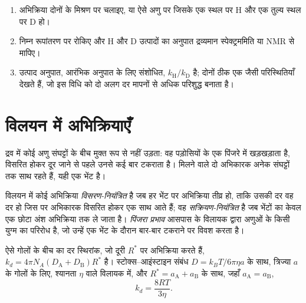 \begin{method}[प्रतिस्पर्धा द्वारा गतिक समस्थानिक प्रभाव का मापन]\label{met:b3:rate-theories:kie}
\begin{enumerate}
  \item अभिक्रिया दोनों  के मिश्रण पर चलाइए, या ऐसे
        अणु पर जिसके एक स्थल पर H और एक तुल्य स्थल पर D हो।
  \item निम्न रूपांतरण पर रोकिए और H और D उत्पादों का अनुपात
        द्रव्यमान स्पेक्ट्रममिति या NMR से मापिए।
  \item उत्पाद अनुपात, आरंभिक अनुपात के लिए संशोधित, $k_{\mathrm H}/k_{\mathrm D}$ है; दोनों
         ठीक एक जैसी परिस्थितियाँ देखते हैं, जो इस विधि को
        दो अलग दर मापनों से अधिक परिशुद्ध बनाता है।
\end{enumerate}
\end{method}

\section{विलयन में अभिक्रियाएँ}

द्रव में कोई अणु संघट्टों के बीच मुक्त रूप से नहीं उड़ता: वह
पड़ोसियों के एक पिंजरे में खड़खड़ाता है, विसरित होकर दूर जाने से पहले उनसे कई बार टकराता है।
मिलने वाले दो अभिकारक अनेक संघट्टों तक साथ रहते हैं, यही एक भेंट है।

\begin{definition}[विसरण और सक्रियण नियंत्रण, पिंजरा प्रभाव]\label{def:b3:rate-theories:diffusion}
विलयन में कोई अभिक्रिया \emph{विसरण-नियंत्रित}
है जब हर भेंट पर अभिक्रिया तीव्र हो, ताकि उसकी दर वह दर हो
जिस पर अभिकारक विसरित होकर एक साथ आते हैं; वह
\emph{सक्रियण-नियंत्रित} है जब भेंटों का केवल एक छोटा
अंश अभिक्रिया तक ले जाता है। \emph{पिंजरा प्रभाव}
आसपास के विलायक द्वारा अणुओं के किसी युग्म का परिरोध है,
जो उन्हें एक भेंट के दौरान बार-बार टकराने पर विवश करता है।
\end{definition}

\begin{proposition}[स्मोलुकोव्स्की सीमा]\label{prop:b3:rate-theories:smoluchowski}
ऐसे गोलों के बीच  का दर स्थिरांक, जो
दूरी $R^*$ पर अभिक्रिया करते हैं, $k_d = 4\pi N_A(D_{\mathrm A} + D_{\mathrm B})R^*$ है। स्टोक्स--आइंस्टाइन
संबंध $D = k_BT/6\pi\eta a$ के साथ, त्रिज्या $a$ के गोलों के लिए, श्यानता $\eta$ वाले विलायक में,
और $R^* = a_{\mathrm A} + a_{\mathrm B}$ के साथ, जहाँ $a_{\mathrm A} = a_{\mathrm B}$,
\[
  k_d = \frac{8RT}{3\eta} .
\]
\end{proposition}

